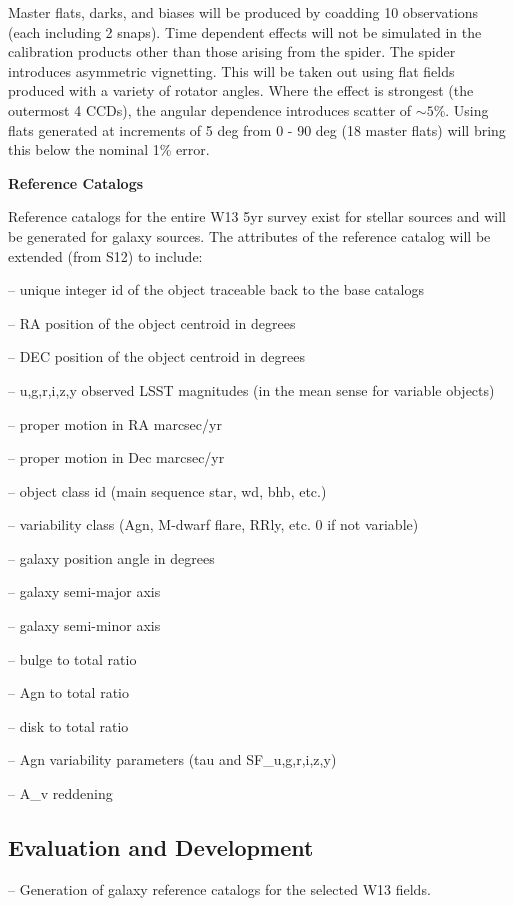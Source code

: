 \documentclass[prd, nofootinbib, floatfix, 11pt,tightenlines,times]{article}
\begin{document}
Master flats, darks, and biases will be produced by coadding 10
observations (each including 2 snaps).  Time dependent effects will not be
simulated in the calibration products other than those arising from
the spider. The spider introduces asymmetric vignetting.  This will be
taken out using flat fields produced with a variety of rotator angles.
Where the effect is strongest (the outermost 4 CCDs), the angular
dependence introduces scatter of $\sim 5$\%.  Using flats generated at
increments of 5 deg from 0 - 90 deg (18 master flats) will bring this
below the nominal 1\% error.


{\bf Reference Catalogs}

Reference catalogs for the entire W13 5yr survey exist for stellar sources
and will be generated for galaxy sources. The attributes of the
reference catalog will be extended (from S12) to include:

-- unique integer id of the object traceable back to the base catalogs

-- RA position of the object centroid in degrees

-- DEC position of the object centroid in degrees

-- {u,g,r,i,z,y} observed LSST magnitudes (in the mean sense for variable objects)

-- proper motion in RA marcsec/yr

-- proper motion in Dec marcsec/yr

-- object class id (main sequence star, wd, bhb, etc.)

-- variability class (Agn, M-dwarf flare, RRly, etc.  0 if not variable)

-- galaxy position angle in degrees 

-- galaxy semi-major axis 

-- galaxy semi-minor axis

-- bulge to total ratio

-- Agn to total ratio

-- disk to total ratio

-- Agn variability parameters (tau and SF\_{u,g,r,i,z,y})

-- A\_v reddening 

\subsection{Evaluation and Development}

-- Generation of galaxy reference catalogs for the selected W13 fields.
\end{document}
